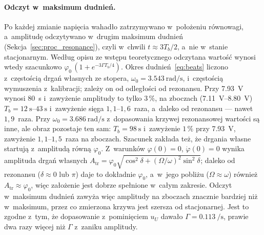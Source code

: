 \documentclass[12pt, a4paper]{article}
\begin{document}
\paragraph{Odczyt w~maksimum dudnień.}
Po każdej zmianie napięcia wahadło zatrzymywano w~położeniu równowagi, a~amplitudę
odczytywano w~drugim maksimum dudnień (Sekcja~\ref{sec:proc_resonance}), czyli
w~chwili $t \approx 3T_b/2$, a~nie w~stanie stacjonarnym. Według opisu ze
wstępu teoretycznego odczytana wartość wynosi wtedy szacunkowo
$\varphi_0\,(1 + e^{-3\Gamma T_b/4})$. Okres dudnień~\eqref{eq:beats} liczono z~częstością
drgań własnych ze stopera, $\omega_0 = \SI{3.543}{\radian\per\second}$, i~częstością
wymuszenia z~kalibracji; zależy on od odległości od rezonansu. Przy \SI{7.93}{\volt}
wynosi \SI{80}{\second} i~zawyżenie amplitudy to tylko $3\,\%$, na zboczach
(\SIrange{7.11}{8.80}{\volt}) $T_b = \SIrange{12}{43}{\second}$ i~zawyżenie sięga
$1{,}1$--$1{,}6$~raza, a~daleko od rezonansu --- nawet $1{,}9$~raza. Przy
$\omega_0 = \SI{3.686}{\radian\per\second}$ z~dopasowania krzywej rezonansowej wartości
są inne, ale obraz pozostaje ten sam: $T_b = \SI{98}{\second}$ i~zawyżenie $1\,\%$
przy \SI{7.93}{\volt}, zawyżenie $1{,}1$--$1{,}5$~raza na zboczach. Szacunek zakłada
też, że drgania własne startują z~amplitudą równą $\varphi_0$. Z~warunków
$\varphi(0) = 0$, $\dot{\varphi}(0) = 0$ wynika amplituda drgań własnych
$A_\text{tr} = \varphi_0\sqrt{\cos^2\delta + (\Omega/\omega)^2\sin^2\delta}$; daleko od
rezonansu ($\delta \approx 0$ lub $\pi$) daje to dokładnie $\varphi_0$, a~w~jego pobliżu
($\Omega \approx \omega$) również $A_\text{tr} \approx \varphi_0$, więc założenie jest
dobrze spełnione w~całym zakresie. Odczyt w~maksimum dudnień zawyża więc amplitudy
na zboczach znacznie bardziej niż w~maksimum, przez co zmierzona krzywa jest szersza
od stacjonarnej. Jest to zgodne z~tym, że dopasowanie z~pominięciem $u_U$ dawało
$\Gamma = \SI{0.113}{\per\second}$, prawie dwa razy więcej niż $\Gamma$ z~zaniku amplitudy.
\end{document}
